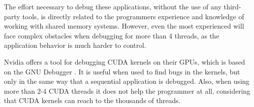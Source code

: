 The effort necessary to debug these applications, without the use of any third-party tools, is directly related to the programmers experience and knowledge of working with shared memory systems. However, even the most experienced will face complex obstacles when debugging for more than 4 threads, as the application behavior is much harder to control.

Nvidia offers a tool for debugging CUDA kernels on their GPUs, which is based on the GNU Debugger \cite{NVIDIA:gdb}. It is useful when used to find bugs in the kernels, but only in the same way that a sequential application is debugged. Also, when using more than 2-4 CUDA threads it does not help the programmer at all, considering that CUDA kernels can reach to the thousands of threads.
